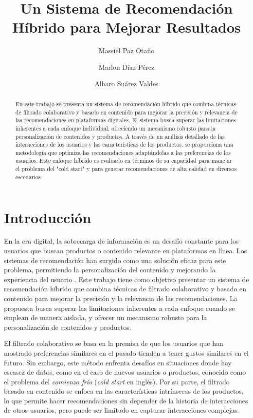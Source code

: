 \documentclass{llncs}
\begin{document}
\title{Un Sistema de Recomendación Híbrido para Mejorar Resultados}
\author{Massiel Paz Otaño \and Marlon Díaz Pérez \and Albaro Suárez Valdes}

\maketitle

\begin{abstract}
En este trabajo se presenta un sistema de recomendación híbrido que combina técnicas de filtrado colaborativo y basado en contenido para mejorar la precisión y relevancia de las recomendaciones en plataformas digitales. El sistema busca superar las limitaciones inherentes a cada enfoque individual, ofreciendo un mecanismo robusto para la personalización de contenidos y productos. A través de un análisis detallado de las interacciones de los usuarios y las características de los productos, se proporciona una metodología que optimiza las recomendaciones adaptándolas a las preferencias de los usuarios. Este enfoque híbrido es evaluado en términos de su capacidad para manejar el problema del "cold start" y para generar recomendaciones de alta calidad en diversos escenarios.
\end{abstract}

\section{Introducción}
En la era digital, la sobrecarga de información es un desafío constante para los usuarios que buscan productos o contenido relevante en plataformas en línea. Los sistemas de recomendación han surgido como una solución eficaz para este problema, permitiendo la personalización del contenido y mejorando la experiencia del usuario \cite{1}. Este trabajo tiene como objetivo presentar un sistema de recomendación híbrido que combina técnicas de filtrado colaborativo y basado en contenido para mejorar la precisión y la relevancia de las recomendaciones. La propuesta busca superar las limitaciones inherentes a cada enfoque cuando se emplean de manera aislada, y ofrecer un mecanismo robusto para la personalización de contenidos y productos.

El filtrado colaborativo se basa en la premisa de que los usuarios que han mostrado preferencias similares en el pasado tienden a tener gustos similares en el futuro. Sin embargo, este método enfrenta desafíos en situaciones donde hay escasez de datos, como en el caso de nuevos usuarios o productos, conocido como el problema del \textit{comienzo frío} (\textit{cold start} en inglés). Por su parte, el filtrado basado en contenido se enfoca en las características intrínsecas de los productos, lo que permite hacer recomendaciones sin depender de la historia de interacciones de otros usuarios, pero puede ser limitado en capturar interacciones complejas.
\end{document}
